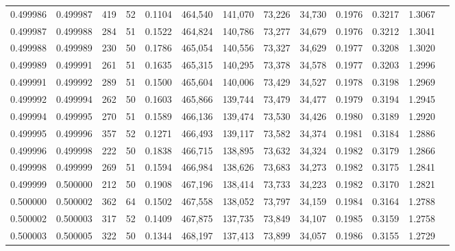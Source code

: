 \begin{tabular}{rrrrrrrrrrrrr}
0.499986 & 0.499987 & 419 &  52 &                                     0.1104 & 464,540 & 141,070 &  73,226 &  34,730 & 0.1976 & 0.3217 & 1.3067 \\
0.499987 & 0.499988 & 284 &  51 &                                     0.1522 & 464,824 & 140,786 &  73,277 &  34,679 & 0.1976 & 0.3212 & 1.3041 \\
0.499988 & 0.499989 & 230 &  50 &                                     0.1786 & 465,054 & 140,556 &  73,327 &  34,629 & 0.1977 & 0.3208 & 1.3020 \\
0.499989 & 0.499991 & 261 &  51 &                                     0.1635 & 465,315 & 140,295 &  73,378 &  34,578 & 0.1977 & 0.3203 & 1.2996 \\
0.499991 & 0.499992 & 289 &  51 &                                     0.1500 & 465,604 & 140,006 &  73,429 &  34,527 & 0.1978 & 0.3198 & 1.2969 \\
0.499992 & 0.499994 & 262 &  50 &                                     0.1603 & 465,866 & 139,744 &  73,479 &  34,477 & 0.1979 & 0.3194 & 1.2945 \\
0.499994 & 0.499995 & 270 &  51 &                                     0.1589 & 466,136 & 139,474 &  73,530 &  34,426 & 0.1980 & 0.3189 & 1.2920 \\
0.499995 & 0.499996 & 357 &  52 &                                     0.1271 & 466,493 & 139,117 &  73,582 &  34,374 & 0.1981 & 0.3184 & 1.2886 \\
0.499996 & 0.499998 & 222 &  50 &                                     0.1838 & 466,715 & 138,895 &  73,632 &  34,324 & 0.1982 & 0.3179 & 1.2866 \\
0.499998 & 0.499999 & 269 &  51 &                                     0.1594 & 466,984 & 138,626 &  73,683 &  34,273 & 0.1982 & 0.3175 & 1.2841 \\
0.499999 & 0.500000 & 212 &  50 &                                     0.1908 & 467,196 & 138,414 &  73,733 &  34,223 & 0.1982 & 0.3170 & 1.2821 \\
0.500000 & 0.500002 & 362 &  64 &                                     0.1502 & 467,558 & 138,052 &  73,797 &  34,159 & 0.1984 & 0.3164 & 1.2788 \\
0.500002 & 0.500003 & 317 &  52 &                                     0.1409 & 467,875 & 137,735 &  73,849 &  34,107 & 0.1985 & 0.3159 & 1.2758 \\
0.500003 & 0.500005 & 322 &  50 &                                     0.1344 & 468,197 & 137,413 &  73,899 &  34,057 & 0.1986 & 0.3155 & 1.2729 \\

\end{tabular}
